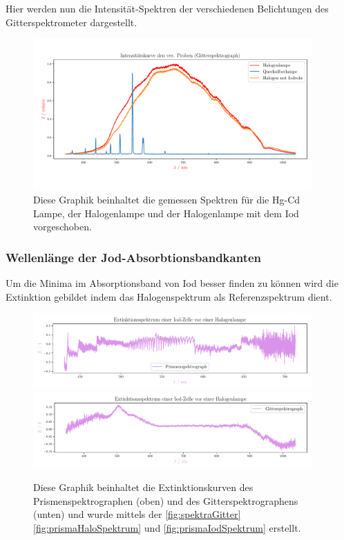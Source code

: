 \documentclass[12pt,english,ngerman]{scrartcl}
\begin{document}
Hier werden nun die Intensität-Spektren der verschiedenen Belichtungen des
Gitterspektrometer dargestellt.

\begin{figure}[H]
	\begin{center}
		\includegraphics[width=0.95\textwidth]{figures/intensity_spektrum_gitter.pdf}
	\end{center}
	\caption{Diese Graphik beinhaltet die gemessen Spektren für die Hg-Cd Lampe,
		der Halogenlampe und der Halogenlampe mit dem Iod vorgeschoben.
	}\label{fig:spektraGitter}
\end{figure}

\subsubsection{Wellenlänge der Jod-Absorbtionsbandkanten}
Um die Minima im Absorptionsband von Iod besser finden zu können wird die
Extinktion gebildet indem das Halogenspektrum als Referenzspektrum dient. 

\begin{figure}[H]
	\begin{center}
		\includegraphics[width=0.95\textwidth]{figures/prism_extinction.pdf}
		\includegraphics[width=0.95\textwidth]{figures/gitter_extinction.pdf}
	\end{center}
	\caption{Diese Graphik beinhaltet die Extinktionskurven des Prismenspektrographen
		(oben) und des Gitterspektrographens (unten) und wurde mittels der 
		\autoref{fig:spektraGitter} \autoref{fig:prismaHaloSpektrum} und 
		\autoref{fig:prismaIodSpektrum} erstellt.
	}\label{fig:extinktionkurven}
\end{figure}
\end{document}
